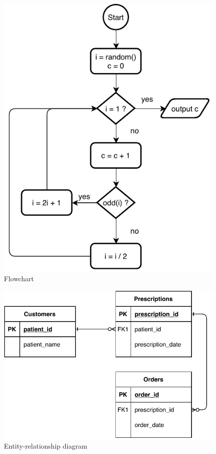 \documentclass[10pt,letterpaper]{article}
\begin{document}
\begin{figure}
  \centering
  \includegraphics[scale=0.6]{flowchart.pdf}
  \caption{Flowchart}
  \label{flowchart.pdf}
\end{figure}

\begin{figure}
  \centering
  \includegraphics[scale=0.6]{er-diagram.pdf}
  \caption{Entity-relationship diagram}
  \label{er-diagram.pdf}
\end{figure}
\end{document}
